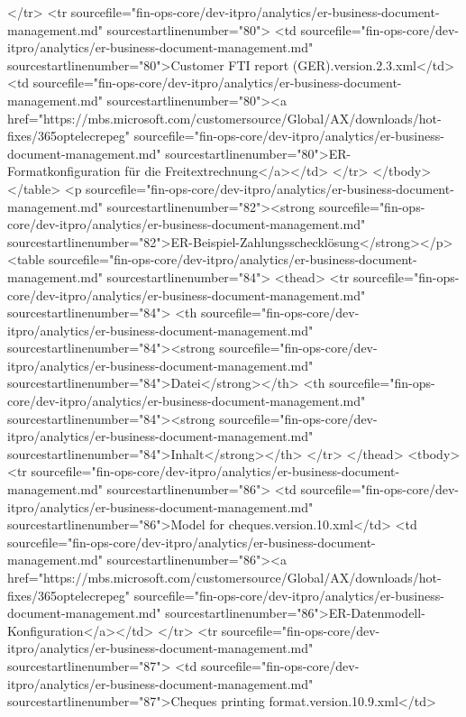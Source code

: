 </tr>
<tr sourcefile="fin-ops-core/dev-itpro/analytics/er-business-document-management.md" sourcestartlinenumber="80">
<td sourcefile="fin-ops-core/dev-itpro/analytics/er-business-document-management.md" sourcestartlinenumber="80">Customer FTI report (GER).version.2.3.xml</td>
<td sourcefile="fin-ops-core/dev-itpro/analytics/er-business-document-management.md" sourcestartlinenumber="80"><a href="https://mbs.microsoft.com/customersource/Global/AX/downloads/hot-fixes/365optelecrepeg" sourcefile="fin-ops-core/dev-itpro/analytics/er-business-document-management.md" sourcestartlinenumber="80">ER-Formatkonfiguration für die Freitextrechnung</a></td>
</tr>
</tbody>
</table>
<p sourcefile="fin-ops-core/dev-itpro/analytics/er-business-document-management.md" sourcestartlinenumber="82"><strong sourcefile="fin-ops-core/dev-itpro/analytics/er-business-document-management.md" sourcestartlinenumber="82">ER-Beispiel-Zahlungsschecklösung</strong></p>
<table sourcefile="fin-ops-core/dev-itpro/analytics/er-business-document-management.md" sourcestartlinenumber="84">
<thead>
<tr sourcefile="fin-ops-core/dev-itpro/analytics/er-business-document-management.md" sourcestartlinenumber="84">
<th sourcefile="fin-ops-core/dev-itpro/analytics/er-business-document-management.md" sourcestartlinenumber="84"><strong sourcefile="fin-ops-core/dev-itpro/analytics/er-business-document-management.md" sourcestartlinenumber="84">Datei</strong></th>
<th sourcefile="fin-ops-core/dev-itpro/analytics/er-business-document-management.md" sourcestartlinenumber="84"><strong sourcefile="fin-ops-core/dev-itpro/analytics/er-business-document-management.md" sourcestartlinenumber="84">Inhalt</strong></th>
</tr>
</thead>
<tbody>
<tr sourcefile="fin-ops-core/dev-itpro/analytics/er-business-document-management.md" sourcestartlinenumber="86">
<td sourcefile="fin-ops-core/dev-itpro/analytics/er-business-document-management.md" sourcestartlinenumber="86">Model for cheques.version.10.xml</td>
<td sourcefile="fin-ops-core/dev-itpro/analytics/er-business-document-management.md" sourcestartlinenumber="86"><a href="https://mbs.microsoft.com/customersource/Global/AX/downloads/hot-fixes/365optelecrepeg" sourcefile="fin-ops-core/dev-itpro/analytics/er-business-document-management.md" sourcestartlinenumber="86">ER-Datenmodell-Konfiguration</a></td>
</tr>
<tr sourcefile="fin-ops-core/dev-itpro/analytics/er-business-document-management.md" sourcestartlinenumber="87">
<td sourcefile="fin-ops-core/dev-itpro/analytics/er-business-document-management.md" sourcestartlinenumber="87">Cheques printing format.version.10.9.xml</td>
